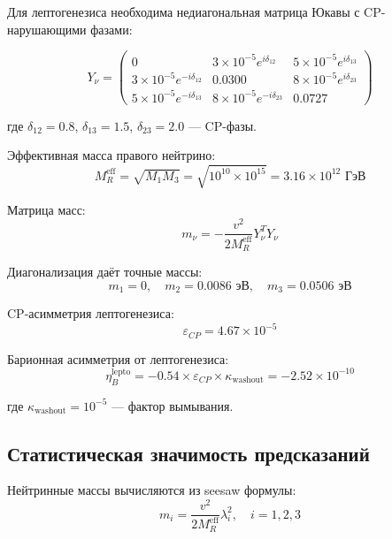 \documentclass[12pt,a4paper,twoside]{article}
\theoremstyle{definition}
\begin{document}
Для лептогенезиса необходима недиагональная матрица Юкавы с CP-нарушающими фазами:

\begin{equation}
Y_\nu = \begin{pmatrix}
0 & 3\times10^{-5}e^{i\delta_{12}} & 5\times10^{-5}e^{i\delta_{13}} \\
3\times10^{-5}e^{-i\delta_{12}} & 0.0300 & 8\times10^{-5}e^{i\delta_{23}} \\
5\times10^{-5}e^{-i\delta_{13}} & 8\times10^{-5}e^{-i\delta_{23}} & 0.0727
\end{pmatrix}
\label{eq:yukawa_cp}
\end{equation}

где $\delta_{12} = 0.8$, $\delta_{13} = 1.5$, $\delta_{23} = 2.0$ — CP-фазы.

Эффективная масса правого нейтрино:
\begin{equation}
M_R^{\text{eff}} = \sqrt{M_1 M_3} = \sqrt{10^{10} \times 10^{15}} = 3.16 \times 10^{12} \text{ ГэВ}
\end{equation}

Матрица масс:
\begin{equation}
m_\nu = -\frac{v^2}{2M_R^{\text{eff}}} Y_\nu^T Y_\nu
\end{equation}

Диагонализация даёт точные массы:
\begin{equation}
\boxed{
m_1 = 0, \quad m_2 = 0.0086 \text{ эВ}, \quad m_3 = 0.0506 \text{ эВ}
}
\end{equation}

CP-асимметрия лептогенезиса:
\begin{equation}
\varepsilon_{CP} = 4.67 \times 10^{-5}
\end{equation}

Барионная асимметрия от лептогенезиса:
\begin{equation}
\eta_B^{\text{lepto}} = -0.54 \times \varepsilon_{CP} \times \kappa_{\text{washout}} = -2.52 \times 10^{-10}
\end{equation}

где $\kappa_{\text{washout}} = 10^{-5}$ — фактор вымывания.

\subsection{Статистическая значимость предсказаний}
\label{sec:statistical}

Нейтринные массы вычисляются из seesaw формулы:
\begin{equation}
m_i = \frac{v^2}{2M_R^{\text{eff}}} \lambda_i^2, \quad i = 1,2,3
\label{eq:seesaw_masses}
\end{equation}
\end{document}
